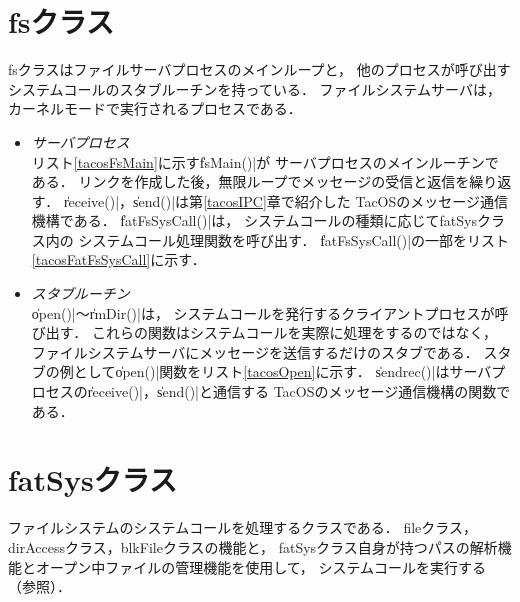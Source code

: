 \section{fsクラス}
fsクラスはファイルサーバプロセスのメインループと，
他のプロセスが呼び出すシステムコールのスタブルーチンを持っている．
ファイルシステムサーバは，カーネルモードで実行されるプロセスである．

\begin{itemize}
\item \emph{サーバプロセス}\\
  リスト\ref{tacosFsMain}に示す\|fsMain()|が
  サーバプロセスのメインルーチンである．
  リンクを作成した後，無限ループでメッセージの受信と返信を繰り返す．
  \|receive()|，\|send()|は第\ref{tacosIPC}章で紹介した
  TacOSのメッセージ通信機構である．
  \|fatFsSysCall()|は，
  システムコールの種類に応じてfatSysクラス内の
  システムコール処理関数を呼び出す．
  \|fatFsSysCall()|の一部をリスト\ref{tacosFatFsSysCall}に示す．
  
  
\item \emph{スタブルーチン}\\
  \|open()|〜\|rmDir()|は，
  システムコールを発行するクライアントプロセスが呼び出す．
  これらの関数はシステムコールを実際に処理をするのではなく，
  ファイルシステムサーバにメッセージを送信するだけのスタブである．
  スタブの例として\|open()|関数をリスト\ref{tacosOpen}に示す．
  \|sendrec()|はサーバプロセスの\|receive()|，\|send()|と通信する
  TacOSのメッセージ通信機構の関数である．
  
\end{itemize}

\section{fatSysクラス}
ファイルシステムのシステムコールを処理するクラスである．
fileクラス，dirAccessクラス，blkFileクラスの機能と，
fatSysクラス自身が持つパスの解析機能とオープン中ファイルの管理機能を使用して，
システムコールを実行する（参照）．

